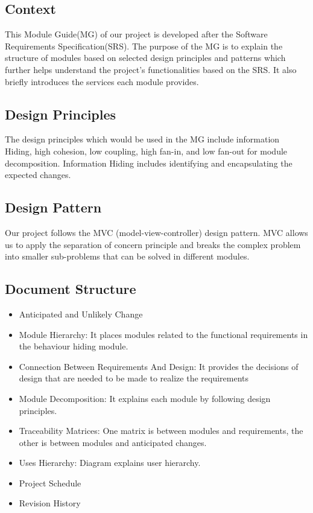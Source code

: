 \documentclass[12pt, titlepage]{article}
\begin{document}
	\subsection{Context}
	This Module Guide(MG) of our project is developed after the Software Requirements Specification(SRS). The purpose of the MG is to explain the structure of modules based on selected design principles and patterns which further helps understand the project's functionalities based on the SRS. It also briefly introduces the services each module provides.
	
	\subsection{Design Principles}
	The design principles which would be used in the MG include information Hiding, high cohesion, low coupling, high fan-in, and low fan-out for module decomposition. Information Hiding includes identifying and encapsulating the expected changes. 

    \subsection{Design Pattern}
    Our project follows the MVC (model-view-controller) design pattern. MVC allows us to apply the separation of concern principle and breaks the complex problem into smaller sub-problems that can be solved in different modules. 

	\subsection{Document Structure}
\begin{itemize}

\item Anticipated and Unlikely Change

\item Module Hierarchy: It places modules related to the functional requirements in the behaviour hiding module.

\item Connection Between Requirements And Design: It provides the decisions of design that are needed to be made to realize the requirements 

\item Module Decomposition: It explains each module by following design principles.

\item Traceability Matrices: One matrix is between modules and requirements, the other is between modules and anticipated changes.

\item Uses Hierarchy: Diagram explains user hierarchy.

\item Project Schedule

\item Revision History
\end{itemize}	
\end{document}
